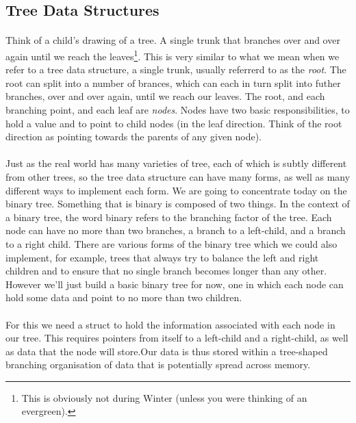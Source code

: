 \documentclass[10pt, a4paper, twosize]{article}
\begin{document}
\subsection{Tree Data Structures}
\paragraph{} Think of a child's drawing of a tree. A single trunk that branches over and over again until we reach the leaves\footnote{This is obviously not during Winter (unless you were thinking of an evergreen).}. This is very similar to what we mean when we refer to a tree data structure, a single trunk, usually referrerd to as the \emph{root}. The root can split into a number of brances, which can each in turn split into futher branches, over and over again, until we reach our leaves. The root, and each branching point, and each leaf are \emph{nodes}. Nodes have two basic responsibilities, to hold a value and to point to child nodes (in the leaf direction. Think of the root direction as pointing towards the parents of any given node).

\paragraph{} Just as the real world has many varieties of tree, each of which is subtly different from other trees, so the tree data structure can have many forms, as well as many different ways to implement each form. We are going to concentrate today on the binary tree. Something that is binary is composed of two things. In the context of a binary tree, the word binary refers to the branching factor of the tree. Each node can have no more than two branches, a branch to a left-child, and a branch to a right child. There are various forms of the binary tree which we could also implement, for example, trees that always try to balance the left and right children and to ensure that no single branch becomes longer than any other. However we'll just build a basic binary tree for now, one in which each node can hold some data and point to no more than two children.

\paragraph{} For this we need a struct to hold the information associated with each node in our tree. This requires pointers from itself to a left-child and a right-child, as well as data that the node will store.Our data is thus stored within a tree-shaped branching organisation of data that is potentially spread across memory.
\end{document}
